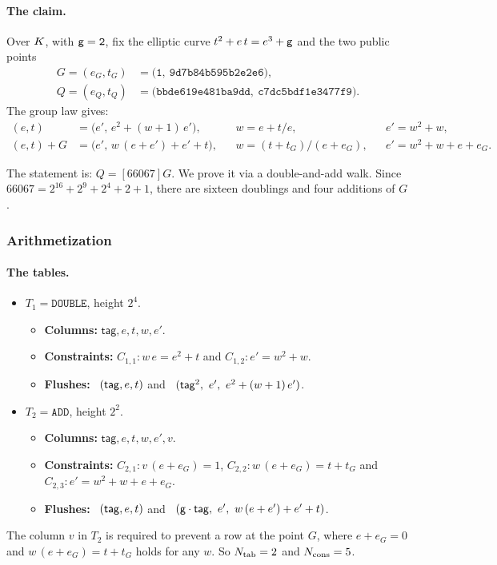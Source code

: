 \paragraph{The claim.} Over $K$, with $\mathsf{g}=\mathtt{2}$, fix the elliptic curve $t^{2}+e\,t=e^{3}+\mathsf{g}$ and the two public points
\begin{align*}
  G=(e_G,t_G)&=\bigl(\mathtt{1},\ \mathtt{9d7b84b595b2e2e6}\bigr),\\
  Q=(e_Q,t_Q)&=\bigl(\mathtt{bbde619e481ba9dd},\ \mathtt{c7dc5bdf1e3477f9}\bigr).
\end{align*}
The group law gives:
\begin{align*}
  [2](e,t)&=\bigl(e',\,e^{2}+(w+1)\,e'\bigr), &&w=e+t/e, &&e'=w^{2}+w,\\
  (e,t)+G&=\bigl(e',\,w\,(e+e')+e'+t\bigr), &&w=(t+t_G)/(e+e_G), &&e'=w^{2}+w+e+e_G .
\end{align*}

The statement is: $Q=[66067]G$. We prove it via a double-and-add walk. Since $66067=2^{16}+2^{9}+2^{4}+2+1$, there are sixteen doublings and four additions of $G$.

\subsubsection{Arithmetization}

\paragraph{The tables.}

\begin{itemize}[itemsep=3pt,topsep=3pt]
\item $T_1=\texttt{DOUBLE}$, height $2^{4}$.
  \begin{itemize}[itemsep=1pt,topsep=1pt,label={}]
  \item \textbf{Columns:} $\mathsf{tag},e,t,w,e'$.
  \item \textbf{Constraints:} $C_{1,1}: w\,e=e^{2}+t$ and $C_{1,2}: e'=w^{2}+w$.
  \item \textbf{Flushes:} \pull\ $( \mathsf{tag},e,t )$ and \push\ $\tup{\mathsf{tag}^{2},\ e',\ e^{2}+(w+1)\,e'}$.
  \end{itemize}
\item $T_2=\texttt{ADD}$, height $2^{2}$.
  \begin{itemize}[itemsep=1pt,topsep=1pt,label={}]
  \item \textbf{Columns:} $\mathsf{tag},e,t,w,e',v$.
  \item \textbf{Constraints:} $C_{2,1}: v\,(e+e_G)=1$, $C_{2,2}: w\,(e+e_G)=t+t_G$ and $C_{2,3}: e'=w^{2}+w+e+e_G$.
  \item \textbf{Flushes:} \pull\ $( \mathsf{tag},e,t )$ and \push\ $\tup{\gen\cdot\mathsf{tag},\ e',\ w\,(e+e')+e'+t}$.
  \end{itemize}
\end{itemize}
The column $v$ in $T_2$ is required to prevent a row at the point $G$, where $e+e_G=0$ and $w\,(e+e_G)=t+t_G$ holds for any $w$. So $N_{\mathrm{tab}}=2$ and $N_{\mathrm{cons}}=5$.

